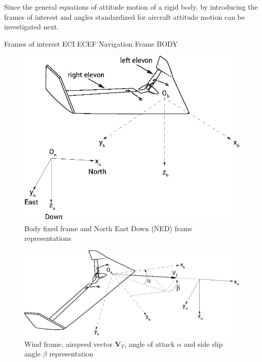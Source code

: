 Since the general equations of attitude motion of a rigid body, by introducing the frames of interest and angles standardized for aircraft attitude motion can be investigated next. 

Frames of interest
	ECI
	ECEF
	Navigation Frame 
	BODY

\begin{figure}
\begin{center}
\includegraphics[width=13cm]{figures/ZagiElevon}    %
\caption{Body fixed frame and North East Down (NED) frame representations} 
\label{fig:bodyNEDframes}
\end{center}
\end{figure}


\begin{figure}
\begin{center}
\includegraphics[width=15cm]{figures/ZagiWindframe}    %
\caption{Wind frame, airspeed vector $\bm{V}_T$, angle of attack $\alpha$ and side slip angle $\beta$ representation \cite{ducard2009fault}} 
\label{fig:windFrame}
\end{center}
\end{figure}

